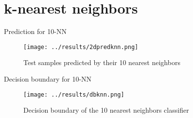 \section{k-nearest neighbors}

\begin{frame}{Prediction for 10-NN}
  \begin{figure}[!htbp]
    \centering
    \small{\caption{Test samples predicted by their 10 nearest neighbors}}
    \texttt{[image: ../results/2dpredknn.png]}
  \end{figure}
\end{frame}

\begin{frame}{Decision boundary for 10-NN}
  \begin{figure}[!htbp]
    \centering
    \small{\caption{Decision boundary of the 10 nearest neighbors classifier}}
    \texttt{[image: ../results/dbknn.png]}
  \end{figure}
\end{frame}

